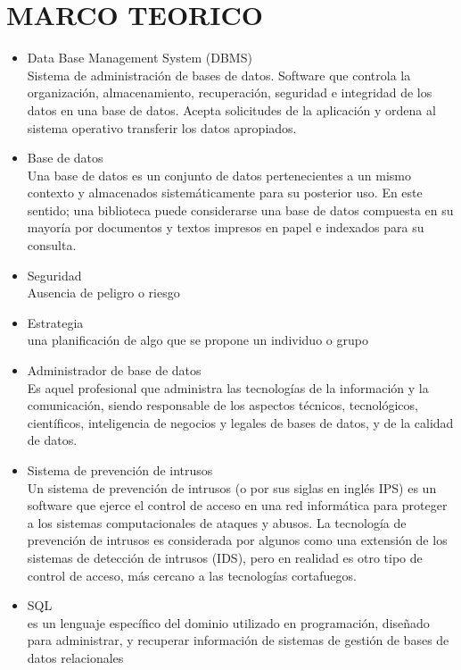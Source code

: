 \section{MARCO TEORICO}

\begin{itemize}
    \item Data Base Management System (DBMS)\\
Sistema de administración de bases de datos. Software que controla la organización, almacenamiento, recuperación, seguridad e integridad de los datos en una base de datos. Acepta solicitudes de la aplicación y ordena al sistema operativo transferir los datos apropiados.

\item Base de datos\\

Una base de datos es un conjunto de datos pertenecientes a un mismo contexto y almacenados sistemáticamente para su posterior uso. En este sentido; una biblioteca puede considerarse una base de datos compuesta en su mayoría por documentos y textos impresos en papel e indexados para su consulta.

\item Seguridad\\

Ausencia de peligro o riesgo

\item Estrategia\\

una planificación de algo que se propone un individuo o grupo

\item Administrador de base de datos\\
Es aquel profesional que administra las tecnologías de la información y la comunicación, siendo responsable de los aspectos técnicos, tecnológicos, científicos, inteligencia de negocios y legales de bases de datos, y de la calidad de datos.


\item Sistema de prevención de intrusos\\

Un sistema de prevención de intrusos (o por sus siglas en inglés IPS) es un software que ejerce el control de acceso en una red informática para proteger a los sistemas computacionales de ataques y abusos. La tecnología de prevención de intrusos es considerada por algunos como una extensión de los sistemas de detección de intrusos (IDS), pero en realidad es otro tipo de control de acceso, más cercano a las tecnologías cortafuegos.


\item SQL\\
es un lenguaje específico del dominio utilizado en programación, diseñado para administrar, y recuperar información de sistemas de gestión de bases de datos relacionales
\end{itemize}
